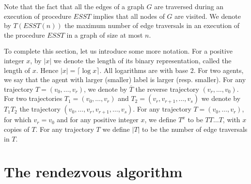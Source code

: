 \documentclass [11pt] {article}
\begin{document}
{Note that the fact that all the edges of a graph $G$ are traversed during an execution of procedure $ESST$ implies that all nodes of $G$ are visited.}
We denote by $T(ESST(n))$ the maximum number of edge traversals in an execution of the procedure $ESST$
in a graph of size at most $n$.

{To complete this section, let us introduce some more notation.} For a positive integer $x$, by $|x|$ we denote the length of its binary representation, called the length of $x$. Hence $|x|=\lceil \log x \rceil$. All logarithms are with base 2.
For two agents, we say that the agent with larger (smaller) label is larger (resp. smaller). For any trajectory $T=(v_0,\dots,v_r)$, we denote by $\overline{T}$  the reverse trajectory $(v_r,\dots,v_0)$. For two trajectories $T_1= (v_0,\dots,v_r)$ and $T_2=(v_r,v_{r+1},\dots ,v_s)$ we denote by $T_1T_2$ the trajectory 
$(v_0,\dots,v_r, v_{r+1},\dots ,v_s)$. For any trajectory $T=(v_0,\dots,v_r)$, for which $v_r=v_0$ and for any positive integer $x$, we define $T^x$ to be $TT\dots T$, 
with $x$ copies of $T$.
For any trajectory $T$ we define $|T|$ to be the number of {edge traversals} in $T$.

\section{The rendezvous algorithm}
\end{document}
